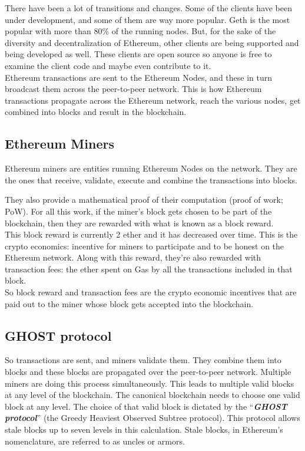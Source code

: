 There have been a lot of transitions and changes.
Some of the clients have been under development, and some of them are way more popular.
Geth is the most popular with more than 80\% of the running nodes.
But, for the sake of the diversity and decentralization of Ethereum, other clients are being supported and being developed as well.
These clients are open source so anyone is free to examine the client code and maybe even contribute to it.\\

Ethereum transactions are sent to the Ethereum Nodes, and these in turn broadcast them across the peer-to-peer network.
This is how Ethereum transactions propagate across the Ethereum network, reach the various nodes, get combined into blocks and result in the blockchain.

\subsection*{Ethereum Miners}

Ethereum miners are entities running Ethereum Nodes on the network.
They are the ones that receive, validate, execute and combine the transactions into blocks.

They also provide a mathematical proof of their computation (proof of work; PoW).
For all this work, if the miner's block gets chosen to be part of the blockchain, then they are rewarded with what is known as a block reward.\\

This block reward is currently 2 ether and it has decreased over time. This is the crypto economics: incentive for miners to participate and to be honest on the Ethereum network.
Along with this reward, they're also rewarded with transaction fees: the ether spent on Gas by all the transactions included in that block.\\

So block reward and transaction fees are the crypto economic incentives that are paid out to the miner whose block gets accepted into the blockchain.

\subsection*{GHOST protocol}

So transactions are sent, and miners validate them.
They combine them into blocks and these blocks are propagated over the peer-to-peer network.
Multiple miners are doing this process simultaneously.
This leads to multiple valid blocks at any level of the blockchain.
The canonical blockchain needs to choose one valid block at any level.
The choice of that valid block is dictated by the ``\textbf\textit{GHOST protocol}'' (the Greedy Heaviest Observed Subtree protocol).
This protocol allows stale blocks up to seven levels in this calculation.
Stale blocks, in Ethereum's nomenclature, are referred to as uncles or armors.

